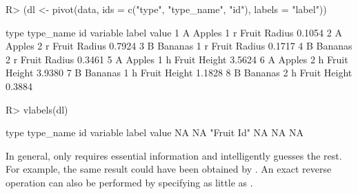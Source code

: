 \documentclass[article]{jss}
\newcommand{\fct}[1]{\code{#1()}}
\begin{document}
%
\begin{Schunk}
\begin{Sinput}
R> (dl <- pivot(data, ids = c("type", "type_name", "id"), labels = "label"))
\end{Sinput}
\begin{Soutput}
  type type_name id variable        label  value
1    A    Apples  1        r Fruit Radius 0.1054
2    A    Apples  2        r Fruit Radius 0.7924
3    B   Bananas  1        r Fruit Radius 0.1717
4    B   Bananas  2        r Fruit Radius 0.3461
5    A    Apples  1        h Fruit Height 3.5624
6    A    Apples  2        h Fruit Height 3.9380
7    B   Bananas  1        h Fruit Height 1.1828
8    B   Bananas  2        h Fruit Height 0.3884
\end{Soutput}
\begin{Sinput}
R> vlabels(dl)
\end{Sinput}
\begin{Soutput}
      type  type_name         id   variable      label      value 
        NA         NA "Fruit Id"         NA         NA         NA 
\end{Soutput}
\end{Schunk}
%
In general, \fct{pivot} only requires essential information and intelligently guesses the rest. For example, the same result could have been obtained by . An exact reverse operation can also be performed by specifying as little as . \newline
\end{document}
